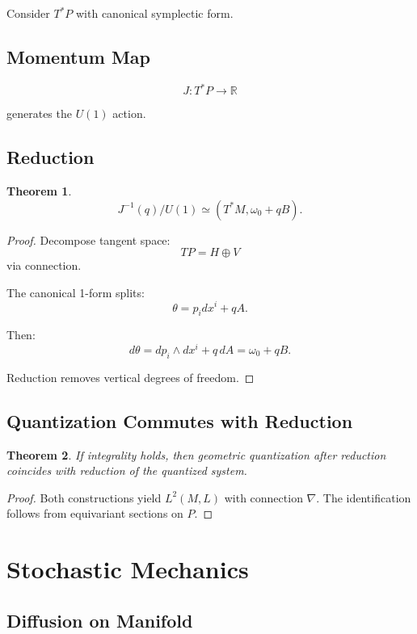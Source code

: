 \documentclass[11pt]{article}
\newtheorem{theorem}{Theorem}[section]
\begin{document}
Consider $T^*P$ with canonical symplectic form.

\subsection{Momentum Map}

\[
J: T^*P \to \mathbb{R}
\]

generates the $U(1)$ action.

\subsection{Reduction}

\begin{theorem}
\[
J^{-1}(q)/U(1) \simeq (T^*M, \omega_0 + qB).
\]
\end{theorem}

\begin{proof}
Decompose tangent space:
\[
TP = H \oplus V
\]
via connection.

The canonical 1-form splits:
\[
\theta = p_i dx^i + qA.
\]

Then:
\[
d\theta = dp_i \wedge dx^i + q\,dA = \omega_0 + qB.
\]

Reduction removes vertical degrees of freedom.
\end{proof}

\subsection{Quantization Commutes with Reduction}

\begin{theorem}
If integrality holds, then geometric quantization after reduction coincides with reduction of the quantized system.
\end{theorem}

\begin{proof}
Both constructions yield $L^2(M,L)$ with connection $\nabla$. The identification follows from equivariant sections on $P$.
\end{proof}

\section{Stochastic Mechanics}

\subsection{Diffusion on Manifold}
\end{document}
